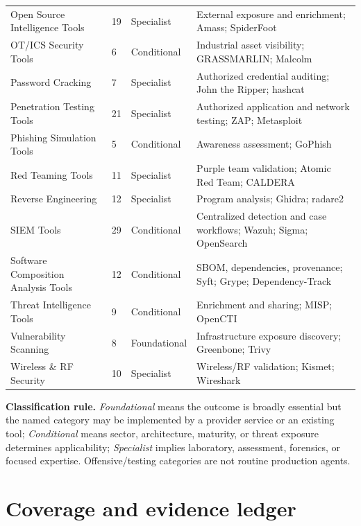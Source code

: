 \documentclass[11pt,oneside]{report}
\begin{document}
\begin{longtable}{P{0.30\textwidth}P{0.08\textwidth}P{0.18\textwidth}P{0.31\textwidth}}
Open Source Intelligence Tools & 19 & Specialist & External exposure and enrichment; Amass; SpiderFoot \\
OT/ICS Security Tools & 6 & Conditional & Industrial asset visibility; GRASSMARLIN; Malcolm \\
Password Cracking & 7 & Specialist & Authorized credential auditing; John the Ripper; hashcat \\
Penetration Testing Tools & 21 & Specialist & Authorized application and network testing; ZAP; Metasploit \\
Phishing Simulation Tools & 5 & Conditional & Awareness assessment; GoPhish \\
Red Teaming Tools & 11 & Specialist & Purple team validation; Atomic Red Team; CALDERA \\
Reverse Engineering & 12 & Specialist & Program analysis; Ghidra; radare2 \\
SIEM Tools & 29 & Conditional & Centralized detection and case workflows; Wazuh; Sigma; OpenSearch \\
Software Composition Analysis Tools & 12 & Conditional & SBOM, dependencies, provenance; Syft; Grype; Dependency-Track \\
Threat Intelligence Tools & 9 & Conditional & Enrichment and sharing; MISP; OpenCTI \\
Vulnerability Scanning & 8 & Foundational & Infrastructure exposure discovery; Greenbone; Trivy \\
Wireless \& RF Security & 10 & Specialist & Wireless/RF validation; Kismet; Wireshark \\
\bottomrule
\end{longtable}
\textbf{Classification rule.} \emph{Foundational} means the outcome is broadly essential but the named category may be implemented by a provider service or an existing tool; \emph{Conditional} means sector, architecture, maturity, or threat exposure determines applicability; \emph{Specialist} implies laboratory, assessment, forensics, or focused expertise. Offensive/testing categories are not routine production agents.

\section{Coverage and evidence ledger}
\end{document}
